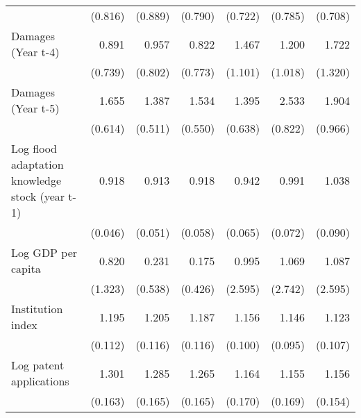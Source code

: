 \begin{table}[htbp]
\begin{tabular}{l*{6}{D{.}{.}{-1}}}
                    &     (0.816)         &     (0.889)         &     (0.790)         &     (0.722)         &     (0.785)         &     (0.708)         \\
\addlinespace
Damages (Year t-4)  &       0.891         &       0.957         &       0.822         &       1.467         &       1.200         &       1.722         \\
                    &     (0.739)         &     (0.802)         &     (0.773)         &     (1.101)         &     (1.018)         &     (1.320)         \\
\addlinespace
Damages (Year t-5)  &       1.655         &       1.387         &       1.534         &       1.395         &       2.533\sym{***}&       1.904         \\
                    &     (0.614)         &     (0.511)         &     (0.550)         &     (0.638)         &     (0.822)         &     (0.966)         \\
\addlinespace
Log flood adaptation knowledge stock (year t-1)&       0.918\sym{*}  &       0.913         &       0.918         &       0.942         &       0.991         &       1.038         \\
                    &     (0.046)         &     (0.051)         &     (0.058)         &     (0.065)         &     (0.072)         &     (0.090)         \\
\addlinespace
Log GDP per capita  &       0.820         &       0.231         &       0.175         &       0.995         &       1.069         &       1.087         \\
                    &     (1.323)         &     (0.538)         &     (0.426)         &     (2.595)         &     (2.742)         &     (2.595)         \\
\addlinespace
Institution index   &       1.195\sym{*}  &       1.205\sym{*}  &       1.187\sym{*}  &       1.156\sym{*}  &       1.146         &       1.123         \\
                    &     (0.112)         &     (0.116)         &     (0.116)         &     (0.100)         &     (0.095)         &     (0.107)         \\
\addlinespace
Log patent applications&       1.301\sym{**} &       1.285\sym{*}  &       1.265\sym{*}  &       1.164         &       1.155         &       1.156         \\
                    &     (0.163)         &     (0.165)         &     (0.165)         &     (0.170)         &     (0.169)         &     (0.154)         \\

\end{tabular}
\end{table}
